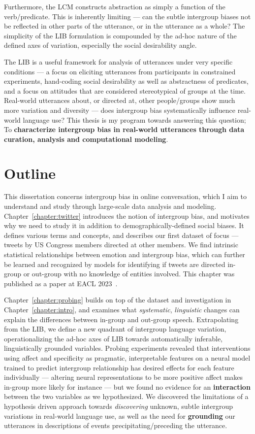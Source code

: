 Furthermore, the LCM constructs abstraction as simply a function of the verb/predicate. This is inherently limiting --- can the subtle intergroup biases not be reflected in other parts of the utterance, or in the utterance as a whole? The simplicity of the LIB formulation is compounded by the ad-hoc nature of the defined axes of variation, especially the social desirability angle. 

The LIB is a useful framework for analysis of utterances under very specific conditions --- a focus on eliciting utterances from participants in constrained experiments, hand-coding social desirability as well as abstractness of predicates, and a focus on attitudes that are considered stereotypical of groups at the time. Real-world utterances about, or directed at, other people/groups show much more variation and diversity --- does intergroup bias systematically influence real-world language use? This thesis is my program towards answering this question; To \textbf{characterize intergroup bias in real-world utterances through data curation, analysis and computational modeling}.

\section{Outline}

This dissertation concerns intergroup bias in online conversation, which I aim to understand and study through large-scale data analysis and modeling. Chapter~\ref{chapter:twitter} introduces the notion of intergroup bias, and motivates why we need to study it in addition to demographically-defined social biases. It defines various terms and concepts, and describes our first dataset of focus --- tweets by US Congress members directed at other members. We find intrinsic statistical relationships between emotion and intergroup bias, which can further be learned and recognized by models for identifying if tweets are directed in-group or out-group with no knowledge of entities involved. This chapter was published as a paper at EACL 2023~\citep{govindarajan-etal-2023-people}. 

Chapter~\ref{chapter:probing} builds on top of the dataset and investigation in Chapter~\ref{chapter:intro}, and examines what \emph{systematic}, \emph{linguistic} changes can explain the differences between in-group and out-group speech. Extrapolating from the LIB, we define a new quadrant of intergroup language variation, operationalizing the ad-hoc axes of LIB towards automatically inferable, linguistically grounded variables. Probing experiments revealed that interventions using affect and specificity as pragmatic, interpretable features on a neural model trained to predict intergroup relationship has desired effects for each feature individually --- altering neural representations to be more positive affect makes in-group more likely for instance --- but we found no evidence for an \textbf{interaction} between the two variables as we hypothesized. We discovered the limitations of a hypothesis driven approach towards \emph{discovering} unknown, subtle intergroup variations in real-world language use, as well as the need for \textbf{grounding} our utterances in descriptions of events precipitating/preceding the utterance.

